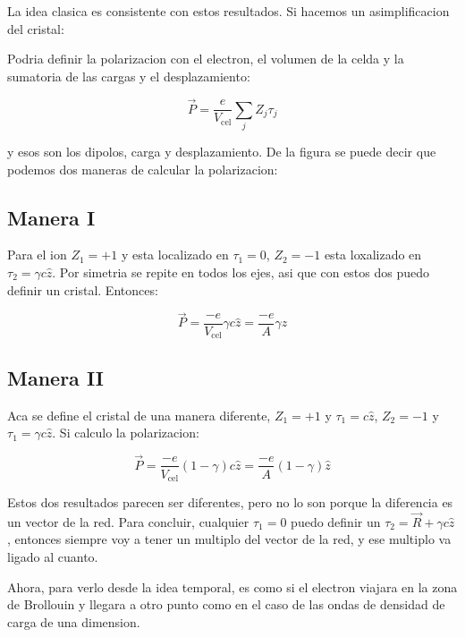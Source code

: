 \documentclass[11pt,fleqn]{book}
\begin{document}
La idea clasica es consistente con estos resultados. Si hacemos un asimplificacion del cristal:


Podria definir la polarizacion con el electron, el volumen de la celda y la sumatoria de las cargas y el desplazamiento:

\begin{equation}
    \vec{P}=\frac{e}{V_{\text{cel}}}\sum_{j}Z_{j}\tau_{j}
\end{equation}

y esos son los dipolos, carga y desplazamiento. De la figura se puede decir que podemos dos maneras de calcular la polarizacion:


\subsection{Manera I}


Para el ion $Z_{1}=+1$ y esta localizado en $\tau_{1}=0$, $Z_{2}=-1$ esta loxalizado en $\tau_{2}=\gamma c\hat{z}$. Por simetria se repite en todos los ejes, asi que con estos dos puedo definir un cristal. Entonces:

\begin{equation}
    \vec{P}=\frac{-e}{V_{\text{cel}}}\gamma c\hat{z}=\frac{-e}{A}\gamma\hat{z}
\end{equation}

\subsection{Manera II}

Aca se define el cristal de una manera diferente, $Z_{1}=+1$ y $\tau_{1}=c\hat{z}$, $Z_{2}=-1$ y $\tau_{1}=\gamma c\hat{z}$. Si calculo la polarizacion: 

\begin{equation}
    \vec{P}=\frac{-e}{V_{\text{cel}}}(1-\gamma)c\hat{z}=\frac{-e}{A}(1-\gamma)\hat{z}
\end{equation}

Estos dos resultados parecen ser diferentes, pero no lo son porque la diferencia es un vector de la red. Para concluir, cualquier $\tau_{1}=0$ puedo definir un  $\tau_{2}=\vec{R}+\gamma c\hat{z}$, entonces siempre voy a tener un multiplo del vector de la red, y ese multiplo va ligado al cuanto.

Ahora, para verlo desde la idea temporal, es como si el electron viajara en la zona de Brollouin y llegara a otro punto como en el caso de las ondas de densidad de carga de una dimension.
\end{document}

